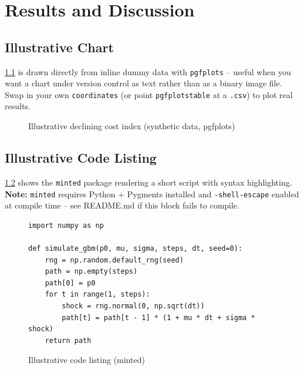 \chapter{Results and Discussion}
\label{chap:results}


\section{Illustrative Chart}

\cref{fig:sample-chart} is drawn directly from inline dummy data with \texttt{pgfplots} -- useful when you want a chart under version control as text rather than as a binary image file. Swap in your own \texttt{coordinates} (or point \texttt{pgfplotstable} at a \texttt{.csv}) to plot real results.

\begin{figure}[H]
\centering
{}
\caption{Illustrative declining cost index (synthetic data, pgfplots)}
\label{fig:sample-chart}
\end{figure}

\section{Illustrative Code Listing}

\cref{lst:sample-code} shows the \texttt{minted} package rendering a short script with syntax highlighting. \textbf{Note:} \texttt{minted} requires Python + Pygments installed and \texttt{-shell-escape} enabled at compile time -- see README.md if this block fails to compile.

\begin{figure}[H]
\begin{verbatim}
import numpy as np

def simulate_gbm(p0, mu, sigma, steps, dt, seed=0):
    rng = np.random.default_rng(seed)
    path = np.empty(steps)
    path[0] = p0
    for t in range(1, steps):
        shock = rng.normal(0, np.sqrt(dt))
        path[t] = path[t - 1] * (1 + mu * dt + sigma * shock)
    return path
\end{verbatim}
\caption{Illustrative code listing (minted)}
\label{lst:sample-code}
\end{figure}

